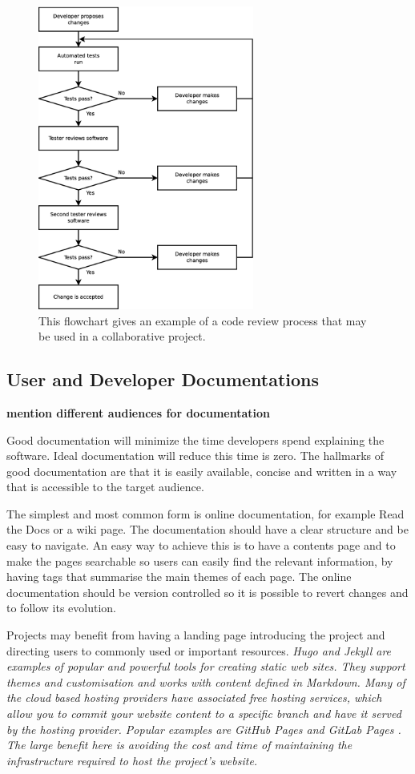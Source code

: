 \documentclass[jnr]{iosart2x}
\newcommand{\todo}[1]{\textbf{#1}}
\begin{document}
\begin{figure}
    \centering
    \includegraphics[height=10cm]{code_review_process.eps}
    \caption{This flowchart gives an example of a code review process that may be used in a collaborative project.}
    \label{Code_Review_Process}
\end{figure}

\subsection{User and Developer Documentations}
\label{Documentation}

\todo{mention different audiences for documentation}

Good documentation will minimize the time developers spend explaining the software.
Ideal documentation will reduce this time is zero.
The hallmarks of good documentation are that it is easily available, concise and written in a way that is accessible to the target audience.

The simplest and most common form is online documentation, for example Read the Docs \cite{Read_The_Docs} or a wiki page.
The documentation should have a clear structure and be easy to navigate.
An easy way to achieve this is to have a contents page and to make the pages searchable so users can easily find the relevant information, by having tags that summarise the main themes of each page.
The online documentation should be version controlled so it is possible to revert changes and to follow its evolution.

Projects may benefit from having a landing page introducing the project and directing users to commonly used or important resources.
\it Hugo \cite{Hugo} and \it Jekyll \cite{Jekyll} are examples of popular and powerful tools for creating static web sites.
They support themes and customisation and works with content defined in Markdown.
Many of the cloud based hosting providers have associated free hosting services, which allow you to commit your website content to a specific branch and have it served by the hosting provider.
Popular examples are \it GitHub Pages \cite{GitHub_Pages} and \it GitLab Pages \cite{GitLab_Pages}.
The large benefit here is avoiding the cost and time of maintaining the infrastructure required to host the project's website.
\end{document}
